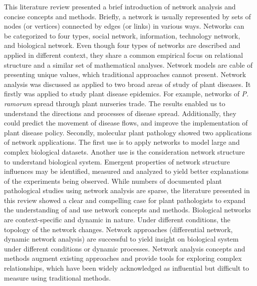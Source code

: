 \documentclass[12pt, oneside]{report}
\begin{document}
This literature review presented a brief introduction of network analysis and concise concepts and methods. Briefly, a network is usually represented by sets of nodes (or vertices) connected by edges (or links) in various ways. Networks can be categorized to four types, social network, information, technology network, and biological network. Even though four types of networks are described and applied in different context, they share a common empirical focus on relational structure and a similar set of mathematical analyses. Network models are cable of presenting unique values, which traditional approaches cannot present. Network analysis was discussed as applied to two broad areas of study of plant diseases. It firstly was applied to study plant disease epidemics. For example, networks of \textit{P. ramorum} spread through plant nurseries trade. The results enabled us to understand the directions and processes of disease spread. Additionally, they could predict the movement of disease flows, and improve the implementation of plant disease policy. Secondly, molecular plant pathology showed two applications of network applications. The first use is to apply networks to model large and complex biological datasets. Another use is the consideration network structure to understand biological system. Emergent properties of network structure influences may be identified, measured and analyzed to yield better explanations of the experiments being observed. While numbers of documented plant pathological studies using network analysis are sparse, the literature presented in this review showed a clear and compelling case for plant pathologists to expand the understanding of and use network concepts and methods. 
Biological networks are context-specific and dynamic in nature. Under different conditions, the topology of the network changes. Network approaches (differential network, dynamic network analysis) are successful to yield insight on biological system under different conditions or dynamic processes. Network analysis concepts and methods augment existing approaches and provide tools for exploring complex relationships, which have been widely acknowledged as influential but difficult to measure using traditional methods. 


\cleardoublepage
\begin{singlespace}
\renewcommand{\bibname}{LITERATURE CITED}

\end{singlespace}
\end{document}
